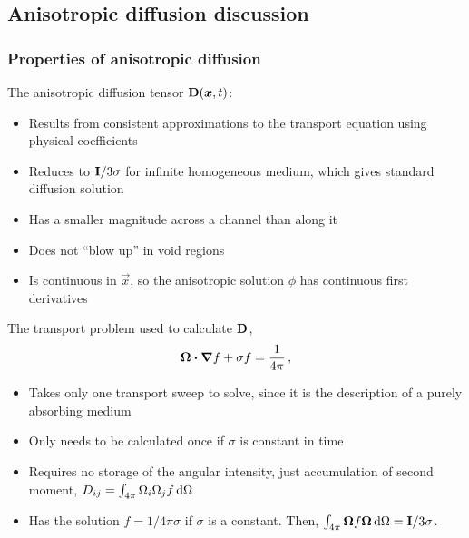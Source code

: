 \documentclass[draft]{beamer}
\begin{document}
\subsection{Anisotropic diffusion discussion}
\begin{frame}
  \frametitle{Properties of anisotropic diffusion}

  The anisotropic diffusion tensor $\mathbf{D}(\bm{x},t)$: 
  \begin{itemize}
    \item Results from consistent approximations to the transport equation
      using physical coefficients
    \item Reduces to $\mathbf{I}/3\sigma$ for infinite homogeneous
      medium, which gives standard diffusion solution
    \item Has a smaller magnitude across a channel than along it
    \item Does not ``blow up'' in void regions
    \item Is continuous in $\vec{x}$, so the anisotropic solution $\phi$
      has continuous first derivatives
  \end{itemize}
\end{frame}

\begin{frame}
  The transport problem used to calculate $\mathbf{D}$,
  \begin{equation*}
    \bm{\Omega}\bm{\cdot} \bm{\nabla} f + \sigma f = \frac{1}{4\pi} \,,
  \end{equation*}
  \vspace{-\baselineskip}
  \begin{itemize}
    \item Takes only one transport sweep to solve, since it is the description
      of a purely absorbing medium
    \item Only needs to be calculated once if $\sigma$ is constant in time
    \item Requires no storage of the angular intensity, just accumulation of
      second
      moment, $D_{ij} = \int_{4\pi} \Omega_i \Omega_j f \mathop{}\!\mathrm{d} \Omega$
    \item Has the solution $f=1/4\pi\sigma$ if $\sigma$ is a constant.
      Then, $\int_{4\pi} \bm{\Omega} f \bm{\Omega} \mathop{}\!\mathrm{d} \Omega =
      \mathbf{I}/3\sigma$.
  \end{itemize}
\end{frame}

\end{document}
